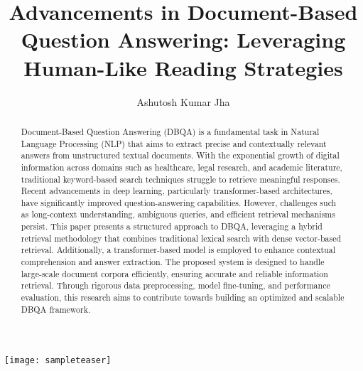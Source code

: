 \documentclass[sigconf]{acmart}
\begin{document}
\title{Advancements in Document-Based Question Answering: Leveraging Human-Like Reading Strategies}

\author{Ashutosh Kumar Jha}


\begin{abstract}
  Document-Based Question Answering (DBQA) is a fundamental task in Natural Language Processing (NLP) that aims to extract precise and contextually relevant answers from unstructured textual documents. With the exponential growth of digital information across domains such as healthcare, legal research, and academic literature, traditional keyword-based search techniques struggle to retrieve meaningful responses. Recent advancements in deep learning, particularly transformer-based architectures, have significantly improved question-answering capabilities. However, challenges such as long-context understanding, ambiguous queries, and efficient retrieval mechanisms persist. This paper presents a structured approach to DBQA, leveraging a hybrid retrieval methodology that combines traditional lexical search with dense vector-based retrieval. Additionally, a transformer-based model is employed to enhance contextual comprehension and answer extraction. The proposed system is designed to handle large-scale document corpora efficiently, ensuring accurate and reliable information retrieval. Through rigorous data preprocessing, model fine-tuning, and performance evaluation, this research aims to contribute towards building an optimized and scalable DBQA framework.
\end{abstract}







\begin{teaserfigure}
  \texttt{[image: sampleteaser]}
  \label{fig:teaser}
\end{teaserfigure}
\end{document}
